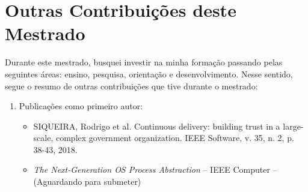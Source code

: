 \section{Outras Contribuições deste Mestrado}

Durante este mestrado, busquei investir na minha formação passando pelas
seguintes áreas: ensino, pesquisa, orientação e desenvolvimento. Nesse sentido,
segue o resumo de outras contribuições que tive durante o mestrado:

\begin{enumerate}
  \item Publicações como primeiro autor:
    \begin{itemize}
      \item
SIQUEIRA, Rodrigo et al. Continuous delivery: building trust in a large-scale, complex government organization. IEEE Software, v. 35, n. 2, p. 38-43, 2018.
      \item \emph{The Next-Generation OS Process Abstraction} -- IEEE Computer -- (Aguardando para submeter)
    \end{itemize}


\end{enumerate}
